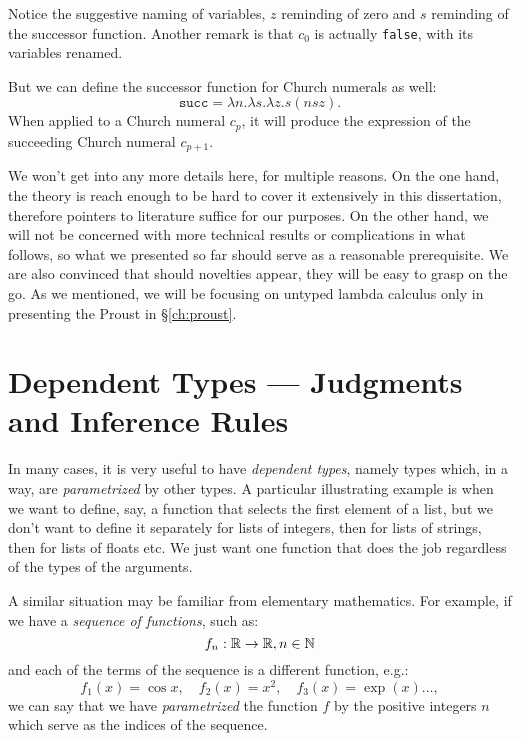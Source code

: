 Notice the suggestive naming of variables, $ z $ reminding of zero
and $ s $ reminding of the successor function. Another remark is that
$ c_0 $ is actually \texttt{false}, with its variables renamed.

But we can define the successor function for Church numerals as well:
\[
  \texttt{succ} = \lambda n . \lambda s . \lambda z . s (n s z).
\]
When applied to a Church numeral $ c_p $, it will produce the expression
of the succeeding Church numeral $ c_{p + 1} $.

We won't get into any more details here, for multiple reasons. On the
one hand, the theory is reach enough to be hard to cover it extensively
in this dissertation, therefore pointers to literature suffice for our
purposes. On the other hand, we will not be concerned with more technical
results or complications in what follows, so what we presented so far
should serve as a reasonable prerequisite. We are also convinced that
should novelties appear, they will be easy to grasp on the go.
As we mentioned, we will be focusing on untyped lambda calculus only in
presenting the Proust  in \S\ref{ch:proust}.

\section{Dependent Types --- Judgments and Inference Rules}
\label{sec:depty}

In many cases, it is very useful to have \emph{dependent types}, namely
types which, in a way, are \emph{parametrized} by other types. A particular
illustrating example is when we want to define, say, a function that selects
the first element of a list, but we don't want to define it separately
for lists of integers, then for lists of strings, then for lists of floats
etc. We just want one function that does the job regardless of the types
of the arguments.

A similar situation may be familiar from elementary mathematics. For example,
if we have a \emph{sequence of functions}, such as:
\[
  f_n : \mathbb{R} \to \mathbb{R}, n \in \mathbb{N}
\]
and each of the terms of the sequence is a different function, e.g.:
\[
  f_1(x) = \cos x, \quad f_2(x) = x^2, \quad f_3(x) = \exp(x) \dots,
\]
we can say that we have \emph{parametrized} the function $ f $ by
the positive integers $ n $ which serve as the indices of the sequence.

